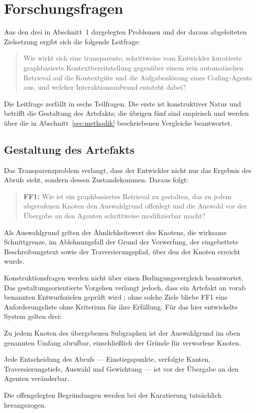 
\section{Forschungsfragen}
\label{sec:forschungsfragen}

Aus den drei in Abschnitt~1 dargelegten Problemen und der daraus abgeleiteten Zielsetzung ergibt sich die folgende Leitfrage:

\begin{quote}
Wie wirkt sich eine transparente, schrittweise vom Entwickler kuratierte graphbasierte Kontextbereitstellung gegenüber einem rein automatischen Retrieval auf die Kontextgüte und die Aufgabenlösung eines Coding-Agents aus, und welcher Interaktionsaufwand entsteht dabei?
\end{quote}

Die Leitfrage zerfällt in sechs Teilfragen. Die erste ist konstruktiver Natur und betrifft die Gestaltung des Artefakts; die übrigen fünf sind empirisch und werden über die in Abschnitt~\ref{sec:methodik} beschriebenen Vergleiche beantwortet.

\subsection{Gestaltung des Artefakts}

Das Transparenzproblem verlangt, dass der Entwickler nicht nur das Ergebnis des Abrufs sieht, sondern dessen Zustandekommen. Daraus folgt:

\begin{quote}
\textbf{FF1:} Wie ist ein graphbasiertes Retrieval zu gestalten, das zu jedem abgerufenen Knoten den Auswahlgrund offenlegt und die Auswahl vor der Übergabe an den Agenten schrittweise modifizierbar macht?
\end{quote}

Als Auswahlgrund gelten der Ähnlichkeitswert des Knotens, die wirksame Schnittgrenze, im Ablehnungsfall der Grund der Verwerfung, der eingebettete Beschreibungstext sowie der Traversierungspfad, über den der Knoten erreicht wurde.

Konstruktionsfragen werden nicht über einen Bedingungsvergleich beantwortet. Das gestaltungsorientierte Vorgehen verlangt jedoch, dass ein Artefakt an vorab benannten Entwurfszielen geprüft wird \parencite{hevner2004dsr}; ohne solche Ziele bliebe FF1 eine Anforderungsliste ohne Kriterium für ihre Erfüllung. Für das hier entwickelte System gelten drei:

\begin{description}[leftmargin=2.2em,style=nextline,itemsep=0.2em]
  \item[E1] Zu jedem Knoten des übergebenen Subgraphen ist der Auswahlgrund im oben genannten Umfang abrufbar, einschließlich der Gründe für verworfene Knoten.
  \item[E2] Jede Entscheidung des Abrufs --- Einstiegspunkte, verfolgte Kanten, Traversierungstiefe, Auswahl und Gewichtung --- ist vor der Übergabe an den Agenten veränderbar.
  \item[E3] Die offengelegten Begründungen werden bei der Kuratierung tatsächlich herangezogen.
\end{description}

